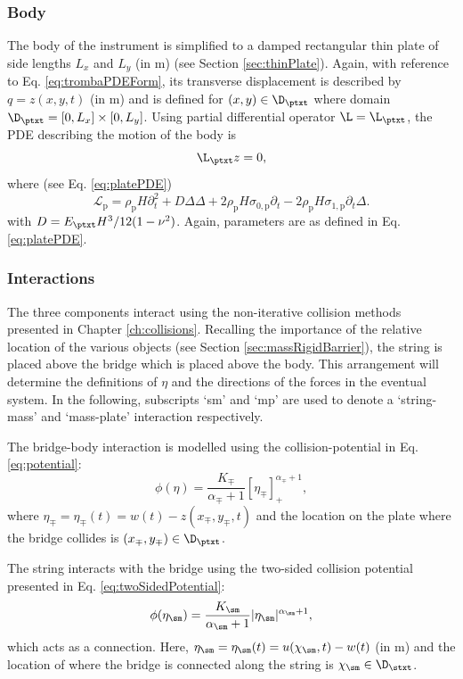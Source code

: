 \subsubsection{Body}
The body of the instrument is simplified to a damped rectangular thin plate of side lengths $L_x$ and $L_y$ (in m) (see Section \ref{sec:thinPlate}). Again, with reference to Eq. \eqref{eq:trombaPDEForm}, its transverse displacement is described by $q = z(x, y, t)$ (in m) and is defined for $(x, y) \in \D_\ptxt$ where domain $\D_\ptxt = [0, L_x] \times [0, L_y]$. Using partial differential operator $\L = \L_\ptxt$, the PDE describing the motion of the body is 
\begin{equation}
    \L_\ptxt z = 0,
\end{equation}
where (see Eq. \eqref{eq:platePDE})
\begin{equation*}
    \mathcal{L}_\text{p} = \rho_\text{p}H\partial_t^2 + D\Delta\Delta +2\rho_\text{p}H\sigma_{0,\text{p}}\partial_t-2\rho_\text{p}H\sigma_{1,\text{p}}\partial_t\Delta.
\end{equation*}
with $D = E_\ptxt H^3/12(1-\nu^2)$. Again, parameters are as defined in Eq. \eqref{eq:platePDE}.

\subsubsection{Interactions}
The three components interact using the non-iterative collision methods presented in Chapter \ref{ch:collisions}. Recalling the importance of the relative location of the various objects (see Section \ref{sec:massRigidBarrier}), the string is placed above the bridge which is placed above the body. This arrangement will determine the definitions of $\eta$ and the directions of the forces in the eventual system. In the following, subscripts `sm' and `mp' are used to denote a `string-mass' and `mass-plate' interaction respectively.

The bridge-body interaction is modelled using the collision-potential in Eq. \eqref{eq:potential}:
\begin{equation}
    \phi(\eta) = \frac{K_\mp}{\alpha_\mp+1}[\eta_\mp]_+^{\alpha_\mp+1},
\end{equation}
where $\eta_\mp = \eta_\mp(t) = w(t) - z(x_\mp, y_\mp, t)$ and the location on the plate where the bridge collides is $(x_\mp, y_\mp)\in \D_\ptxt$. 

The string interacts with the bridge using the two-sided collision potential presented in Eq. \eqref{eq:twoSidedPotential}:
\begin{equation}\label{eq:stringMassPotential}
    \phi(\eta_\sm) = \frac{K_\sm}{\alpha_\sm+1}|\eta_\sm|^{\alpha_\sm+1},
\end{equation}
which acts as a connection.  Here, $\eta_\sm = \eta_\sm(t) = u(\chi_\sm, t) - w(t)$ (in m) and the location of where the bridge is connected along the string is $\chi_\sm \in \D_\stxt$. 

